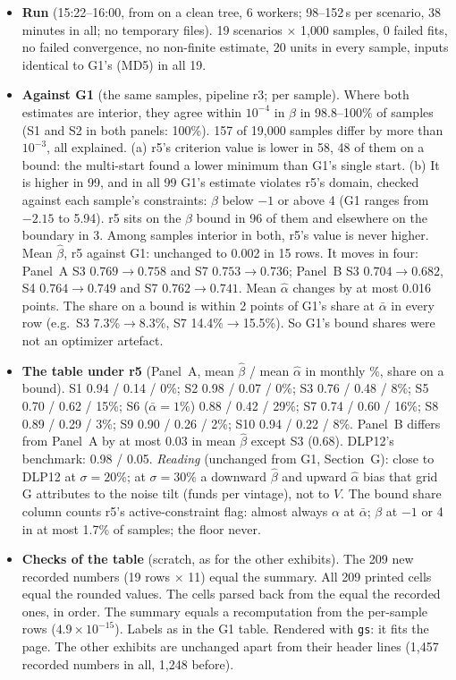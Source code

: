 \documentclass[11pt]{article}
\newcommand{\code}[1]{\texttt{\detokenize{#1}}}
\newcommand{\file}[1]{\path{#1}}
\begin{document}
\begin{itemize}
\item \textbf{Run} (15:22--16:00, from \code{aa67c7a} on a clean tree, 6 workers; 98--152\,s per scenario, 38 minutes in all; no temporary files). 19 scenarios $\times$ 1{,}000 samples, 0 failed fits, no failed convergence, no non-finite estimate, 20 units in every sample, inputs identical to G1's (MD5) in all 19.
\item \textbf{Against G1} (the same samples, pipeline r3; per sample). Where both estimates are interior, they agree within $10^{-4}$ in $\beta$ in 98.8--100\% of samples (S1 and S2 in both panels: 100\%). 157 of 19{,}000 samples differ by more than $10^{-3}$, all explained. (a) r5's criterion value is lower in 58, 48 of them on a bound: the multi-start found a lower minimum than G1's single start. (b) It is higher in 99, and in all 99 G1's estimate violates r5's domain, checked against each sample's constraints: $\beta$ below $-1$ or above 4 (G1 ranges from $-2.15$ to 5.94). r5 sits on the $\beta$ bound in 96 of them and elsewhere on the boundary in 3. Among samples interior in both, r5's value is never higher. Mean $\hat\beta$, r5 against G1: unchanged to 0.002 in 15 rows. It moves in four: Panel~A S3 $0.769\to0.758$ and S7 $0.753\to0.736$; Panel~B S3 $0.704\to0.682$, S4 $0.764\to0.749$ and S7 $0.762\to0.741$. Mean $\hat\alpha$ changes by at most 0.016 points. The share on a bound is within 2 points of G1's share at $\bar\alpha$ in every row (e.g.\ S3 7.3\%$\to$8.3\%, S7 14.4\%$\to$15.5\%). So G1's bound shares were not an optimizer artefact.
\item \textbf{The table under r5} (Panel~A, mean $\hat\beta$ / mean $\hat\alpha$ in monthly \%, share on a bound). S1 0.94 / 0.14 / 0\%; S2 0.98 / 0.07 / 0\%; S3 0.76 / 0.48 / 8\%; S5 0.70 / 0.62 / 15\%; S6 ($\bar\alpha=1\%$) 0.88 / 0.42 / 29\%; S7 0.74 / 0.60 / 16\%; S8 0.89 / 0.29 / 3\%; S9 0.90 / 0.26 / 2\%; S10 0.94 / 0.22 / 8\%. Panel~B differs from Panel~A by at most 0.03 in mean $\hat\beta$ except S3 (0.68). DLP12's benchmark: 0.98 / 0.05. \emph{Reading} (unchanged from G1, Section~G): close to DLP12 at $\sigma=20\%$; at $\sigma=30\%$ a downward $\hat\beta$ and upward $\hat\alpha$ bias that grid G attributes to the noise tilt (funds per vintage), not to $V$. The bound share column counts r5's active-constraint flag: almost always $\alpha$ at $\bar\alpha$; $\beta$ at $-1$ or 4 in at most 1.7\% of samples; the floor never.
\item \textbf{Checks of the table} (scratch, as for the other exhibits). The 209 new recorded numbers (19 rows $\times$ 11) equal the summary. All 209 printed cells equal the rounded values. The cells parsed back from the \file{.tex} equal the recorded ones, in order. The summary equals a recomputation from the per-sample rows ($4.9\times10^{-15}$). Labels as in the G1 table. Rendered with \texttt{gs}: it fits the page. The other exhibits are unchanged apart from their header lines (1{,}457 recorded numbers in all, 1{,}248 before).

\end{itemize}
\end{document}
